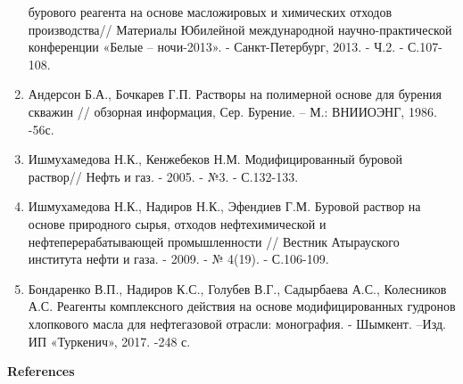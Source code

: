 \begin{enumerate}
  бурового реагента на основе масложировых и химических отходов
  производства// Материалы Юбилейной международной научно-практической
  конференции «Белые -- ночи-2013». - Санкт-Петербург, 2013. - Ч.2. -
  С.107-108.
\item
  Андерсон Б.А., Бочкарев Г.П. Растворы на полимерной основе для бурения
  скважин // обзорная информация, Сер. Бурение. -- М.: ВНИИОЭНГ, 1986.
  -56с.
\item
  Ишмухамедова Н.К., Кенжебеков Н.М. Модифицированный буровой раствор//
  Нефть и газ. - 2005. - №3. - С.132-133.
\item
  Ишмухамедова Н.К., Надиров Н.К., Эфендиев Г.М. Буровой раствор на
  основе природного сырья, отходов нефтехимической и
  нефтеперерабатывающей промышленности // Вестник Атырауского института
  нефти и газа. - 2009. - № 4(19). - С.106-109.
\item
  Бондаренко В.П., Надиров К.С., Голубев В.Г., Садырбаева А.С.,
  Колесников А.С. Реагенты комплексного действия на основе
  модифицированных гудронов хлопкового масла для нефтегазовой отрасли:
  монография. - Шымкент. --Изд. ИП «Туркенич», 2017. -248 с.
\end{enumerate}

{\bfseries References}

